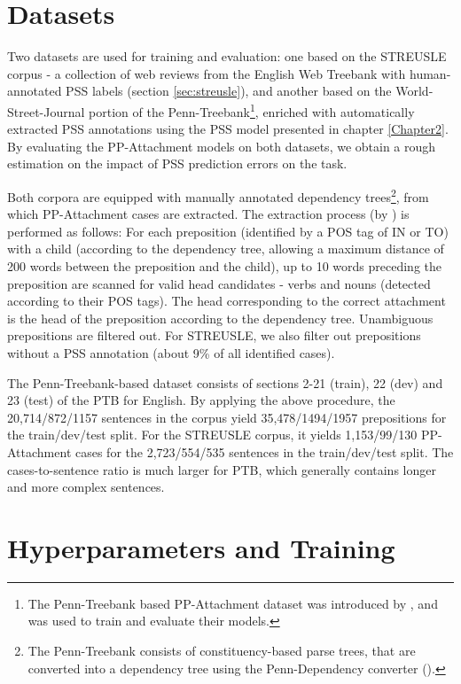\section{Datasets} \label{sec:ppatt_datasets}

Two datasets are used for training and evaluation: one based on the STREUSLE corpus - a collection of web reviews from the English Web Treebank with human-annotated PSS labels (section \ref{sec:streusle}), and another based on the World-Street-Journal portion of the Penn-Treebank\footnote{The Penn-Treebank based PP-Attachment dataset was introduced by \cite{hpcd}, and was used to train and evaluate their models.}, enriched with automatically extracted PSS annotations using the PSS model presented in chapter \ref{Chapter2}. By evaluating the PP-Attachment models on both datasets, we obtain a rough estimation on the impact of PSS prediction errors on the task.

Both corpora are equipped with manually annotated dependency trees\footnote{The Penn-Treebank consists of constituency-based parse trees, that are converted into a dependency tree using the Penn-Dependency converter (\cite{johansson07extended}).}, from which PP-Attachment cases are extracted. The extraction process (by \cite{hpcd}) is performed as follows: For each preposition (identified by a POS tag of IN or TO) with a child (according to the dependency tree, allowing a maximum distance of 200 words between the preposition and the child), up to 10 words preceding the preposition are scanned for valid head candidates - verbs and nouns (detected according to their POS tags). The head corresponding to the correct attachment is the head of the preposition according to the dependency tree. Unambiguous prepositions are filtered out. For STREUSLE, we also filter out prepositions without a PSS annotation (about 9\% of all identified cases).

The Penn-Treebank-based dataset consists of sections 2-21 (train), 22 (dev) and 23 (test) of the PTB for English. By applying the above procedure, the 20,714/872/1157 sentences in the corpus yield 35,478/1494/1957 prepositions for the train/dev/test split. For the STREUSLE corpus, it yields 1,153/99/130 PP-Attachment cases for the 2,723/554/535 sentences in the train/dev/test split. The cases-to-sentence ratio is much larger for PTB, which generally contains longer and more complex sentences. 
    
\section{Hyperparameters and Training}

